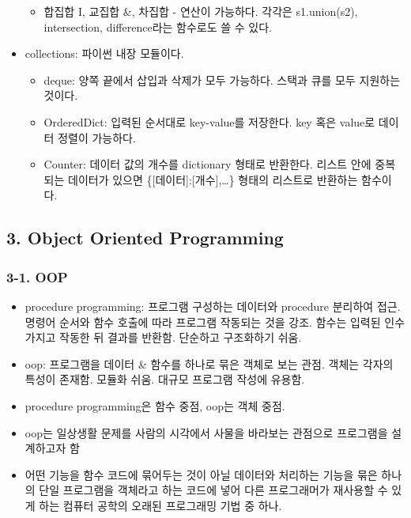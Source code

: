 \begin{itemize}
  \begin{itemize}
  \tightlist
  \item
    합집합 I, 교집합 \&, 차집합 - 연산이 가능하다. 각각은 s1.union(s2),
    intersection, difference라는 함수로도 쓸 수 있다.
  \end{itemize}
\item
  collections: 파이썬 내장 모듈이다.

  \begin{itemize}
  \tightlist
  \item
    deque: 양쪽 끝에서 삽입과 삭제가 모두 가능하다. 스택과 큐를 모두
    지원하는 것이다.
  \item
    OrderedDict: 입력된 순서대로 key-value를 저장한다. key 혹은 value로
    데이터 정렬이 가능하다.
  \item
    Counter: 데이터 값의 개수를 dictionary 형태로 반환한다. 리스트 안에
    중복되는 데이터가 있으면 \{{[}데이터{]}:{[}개수{]},\ldots\} 형태의
    리스트로 반환하는 함수이다.
  \end{itemize}
\end{itemize}



\hypertarget{object-oriented-programming}{%
\subsection{3. Object Oriented
Programming}\label{object-oriented-programming}}

\hypertarget{oop}{%
\subsubsection{3-1. OOP}\label{oop}}

\begin{itemize}
\tightlist
\item
  procedure programming: 프로그램 구성하는 데이터와 procedure 분리하여
  접근. 명령어 순서와 함수 호출에 따라 프로그램 작동되는 것을 강조.
  함수는 입력된 인수 가지고 작동한 뒤 결과를 반환함. 단순하고 구조화하기
  쉬움.
\item
  oop: 프로그램을 데이터 \& 함수를 하나로 묶은 객체로 보는 관점. 객체는
  각자의 특성이 존재함. 모듈화 쉬움. 대규모 프로그램 작성에 유용함.
\item
  procedure programming은 함수 중점, oop는 객체 중점.
\item
  oop는 일상생활 문제를 사람의 시각에서 사물을 바라보는 관점으로
  프로그램을 설계하고자 함
\item
  어떤 기능을 함수 코드에 묶어두는 것이 아닐 데이터와 처리하는 기능을
  묶은 하나의 단일 프로그램을 객체라고 하는 코드에 넣어 다른
  프로그래머가 재사용할 수 있게 하는 컴퓨터 공학의 오래된 프로그래밍
  기법 중 하나.
\end{itemize}

